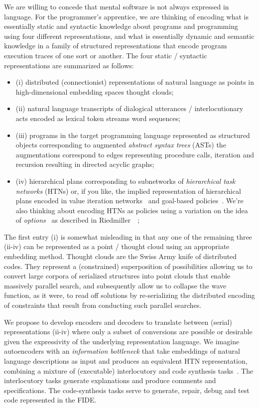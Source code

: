 We are willing to concede that mental software is not always expressed in language. For the programmer's apprentice, we are thinking of encoding what is essentially static and syntactic knowledge about programs and programming using four different representations, and what is essentially dynamic and semantic knowledge in a family of structured representations that encode program execution traces of one sort or another. The four static / syntactic representations are summarized as follows:
%
\begin{itemize}
%
\item (i) distributed (connectionist) representations of natural language as points in high-dimensional embedding spaces \emdash{} thought clouds;
%
\item (ii) natural language transcripts of dialogical utterances / interlocutionary acts encoded as lexical token streams \emdash{} word sequences;
%
\item (iii) programs in the target programming language represented as structured objects corresponding to augmented {\it{abstract syntax trees}} (ASTs)\emdash{} the augmentations correspond to edges representing procedure calls, iteration and recursion resulting in directed acyclic graphs;
%
\item (iv) hierarchical plans corresponding to subnetworks of {\it{hierarchical task networks}} (HTNs) or, if you like, the implied representation of hierarchical plans encoded in value iteration networks~\cite{TamaretalNIPS-16} and goal-based policies~\cite{GroshevetalCoRR-17}. We're also thinking about encoding HTNs as policies using a variation on the idea of {\it{options}}~\cite{SuttonetalAIJ-99} as described in Riedmiller~\etal{}~\cite{RiedmilleretalCoRR-18}; 
%
\end{itemize}

The first entry (i) is somewhat misleading in that any one of the remaining three (ii-iv) can be represented as a point / thought cloud using an appropriate embedding method. Thought clouds are the Swiss Army knife of distributed codes. They represent a (constrained) superposition of possibilities allowing us to convert large corpora of serialized structures into point clouds that enable massively parallel search, and subsequently allow us to collapse the wave function, as it were, to read off solutions by re-serializing the distributed encoding of constraints that result from conducting such parallel searches.

We propose to develop encoders and decoders to translate between (serial) representations (ii-iv) where only a subset of conversions are possible or desirable given the expressivity of the underlying representation language. We imagine autoencoders with an {\it{information bottleneck}} that take embeddings of natural language descriptions as input and produces an equivalent HTN representation, combining a mixture of (executable) interlocutory and code synthesis tasks~\cite{AlemietalCoRR-16b,TishbyandZaslavskyCoRR-15}. The interlocutory tasks generate explanations and produce comments and specifications. The code-synthesis tasks serve to generate, repair, debug and test code represented in the FIDE.

